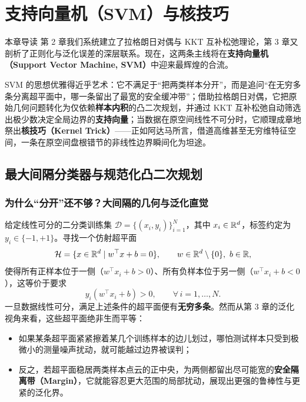 \chapter[支持向量机与核技巧]{支持向量机（SVM）与核技巧}\label{ch:svm}

\begin{chapIntro}{本章导读}
第 2 章我们系统建立了拉格朗日对偶与 KKT 互补松弛理论，第 3 章又剖析了正则化与泛化误差的深层联系。现在，这两条主线将在\textbf{支持向量机（Support Vector Machine, SVM）}中迎来最辉煌的合流。

SVM 的思想优雅得近乎艺术：它不满足于“把两类样本分开”，而是追问“在无穷多条分离超平面中，哪一条留出了最宽的安全缓冲带”；借助拉格朗日对偶，它把原始几何问题转化为仅依赖\textbf{样本内积}的凸二次规划，并通过 KKT 互补松弛自动筛选出极少数决定全局边界的\textbf{支持向量}；当数据在原空间线性不可分时，它顺理成章地祭出\textbf{核技巧（Kernel Trick）}——正如阿达马所言，借道高维甚至无穷维特征空间，一条在原空间盘根错节的非线性边界瞬间化为坦途。
\end{chapIntro}

\section{最大间隔分类器与规范化凸二次规划}\label{sec:svm-margin}

\subsection{为什么“分开”还不够？大间隔的几何与泛化直觉}

给定线性可分的二分类训练集 $\mathcal{D} = \{(x_i, y_i)\}_{i=1}^{N}$，其中 $x_i \in \mathbb{R}^d$，标签约定为 $y_i \in \{-1, +1\}$。寻找一个仿射超平面
\[
  \mathcal{H} = \{x \in \mathbb{R}^d \mid w^\top x + b = 0\}, \qquad w \in \mathbb{R}^d \setminus \{0\},\ b \in \mathbb{R},
\]
使得所有正样本位于一侧（$w^\top x_i + b > 0$）、所有负样本位于另一侧（$w^\top x_i + b < 0$），这等价于要求
\[
  y_i (w^\top x_i + b) > 0, \qquad \forall\, i = 1, \dots, N.
\]
一旦数据线性可分，满足上述条件的超平面便有\textbf{无穷多条}。然而从第 3 章的泛化视角来看，这些超平面绝非生而平等：
\begin{itemize}
  \item 如果某条超平面紧紧擦着某几个训练样本的边儿划过，哪怕测试样本只受到极微小的测量噪声扰动，就可能越过边界被误判；
  \item 反之，若超平面稳居两类样本点云的正中央，为两侧都留出尽可能宽的\textbf{安全隔离带（Margin）}，它就能容忍更大范围的局部扰动，展现出更强的鲁棒性与更紧的泛化界。
\end{itemize}

